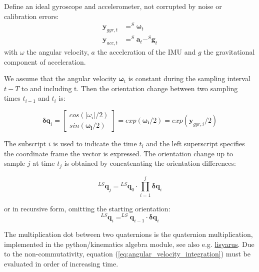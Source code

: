\documentclass{article}
\begin{document}
Define an ideal gyroscope and accelerometer, not corrupted by noise or calibration errors:
\begin{equation} \label{eq:ideal_gyroscope}
\begin{aligned}
\textbf{y}_{gyr, t} &= ^S \boldsymbol{\omega}_t  \\
\textbf{y}_{acc, t} &= ^S\boldsymbol{a}_t - ^S\boldsymbol{g}_t
\end{aligned} 
\end{equation}
with $\omega$ the angular velocity, $a$ the acceleration of the IMU and $g$ the gravitational component of acceleration.

We assume that the angular velocity $\boldsymbol{\omega}_t $ is constant during the sampling interval $t-T$ to and including t. Then the orientation change between two sampling times $t_{i-1}$ and $t_i$ is:

\begin{equation} \label{eq:single_sample_angular_velocity_integration}
\boldsymbol{\delta q}_i = \begin{bmatrix}
cos(\left| \omega_i \right|/2) \\ 
sin(\boldsymbol{\omega_i}/2)
\end{bmatrix} = exp(\boldsymbol{\omega_i}/2) =exp(\boldsymbol{y}_{gyr,i}/2)
\end{equation}

The subscript $i$ is used to indicate the time $t_i$ and the left superscript specifies the coordinate frame the vector is expressed.
The orientation change up to sample $j$ at time $t_j$ is obtained by concatenating the orientation differences:

\begin{equation} \label{eq:angular_velocity_integration}
^{LS}\textbf{q}_{j}={}^{LS}\boldsymbol{q}_0 \cdot \prod_{i=1}^{j}\boldsymbol{\delta q}_i
\end{equation}

or in recursive form, omitting the starting orientation: 
\begin{equation} \label{eq:angular_velocity_integration_recursive}
^{LS}\textbf{q}_i= ^{LS}\textbf{q}_{i-1} \cdot \boldsymbol{\delta q}_i
\end{equation}

The multiplication dot between two quaternions is the quaternion multiplication, implemented in the python/kinematics algebra module, see also e.g. \href{http://lisyarus.github.io/blog/posts/introduction-to-quaternions.html}{lisyarus}. Due to the non-commutativity, equation (\ref{eq:angular_velocity_integration}) must be evaluated in order of increasing time.
\end{document}
